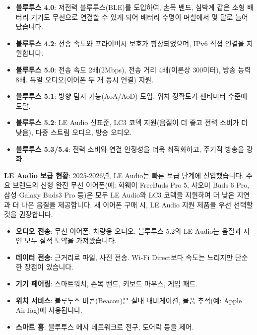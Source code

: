 
\begin{itemize}
  \item \textbf{블루투스 4.0}: 저전력 블루투스(BLE)를 도입하여, 손목 밴드, 심박계 같은 소형 배터리 기기도 무선으로 연결할 수 있게 되어 배터리 수명이 며칠에서 몇 달로 늘어났습니다.
  \item \textbf{블루투스 4.2}: 전송 속도와 프라이버시 보호가 향상되었으며, IPv6 직접 연결을 지원합니다.
  \item \textbf{블루투스 5.0}: 전송 속도 2배(2Mbps), 전송 거리 4배(이론상 300미터), 방송 능력 8배. 듀얼 오디오(이어폰 두 개 동시 연결) 지원.
  \item \textbf{블루투스 5.1}: 방향 탐지 기능(AoA/AoD) 도입, 위치 정확도가 센티미터 수준에 도달.
  \item \textbf{블루투스 5.2}: LE Audio 신표준, LC3 코덱 지원(음질이 더 좋고 전력 소비가 더 낮음), 다중 스트림 오디오, 방송 오디오.
  \item \textbf{블루투스 5.3/5.4}: 전력 소비와 연결 안정성을 더욱 최적화하고, 주기적 방송을 강화.
\end{itemize}

\textbf{LE Audio 보급 현황}: 2025-2026년, LE Audio는 빠른 보급 단계에 진입했습니다. 주요 브랜드의 신형 완전 무선 이어폰(예: 화웨이 FreeBuds Pro 5, 샤오미 Buds 6 Pro, 삼성 Galaxy Buds3 Pro 등)은 모두 LE Audio와 LC3 코덱을 지원하여 더 낮은 지연과 더 나은 음질을 제공합니다. 새 이어폰 구매 시, LE Audio 지원 제품을 우선 선택할 것을 권장합니다.


\begin{itemize}
  \item \textbf{오디오 전송}: 무선 이어폰, 차량용 오디오. 블루투스 5.2의 LE Audio는 음질과 지연 모두 질적 도약을 가져왔습니다.
  \item \textbf{데이터 전송}: 근거리로 파일, 사진 전송. Wi-Fi Direct보다 속도는 느리지만 단순한 장점이 있습니다.
  \item \textbf{기기 페어링}: 스마트워치, 손목 밴드, 키보드 마우스, 게임 패드.
  \item \textbf{위치 서비스}: 블루투스 비콘(Beacon)은 실내 내비게이션, 물품 추적(예: Apple AirTag)에 사용됩니다.
  \item \textbf{스마트 홈}: 블루투스 메시 네트워크로 전구, 도어락 등을 제어.
\end{itemize}


